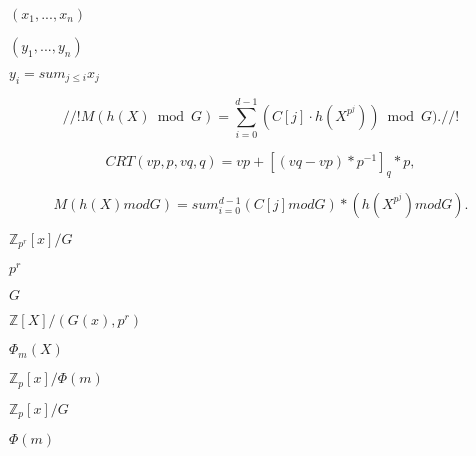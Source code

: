 \documentclass{article}
\begin{document}
$(x_1, ..., x_n)$
\pagebreak

$(y_1, ..., y_n)$
\pagebreak

$y_i = sum_{j\le i} x_j$
\pagebreak

\[ //! M(h(X) \bmod G)= \sum_{i=0}^{d-1}(C[j] \cdot h(X^{p^j}))\bmod G). //! \]
\pagebreak

\[ CRT(vp,p,vq,q) = vp + [(vq-vp) * p^{-1}]_q * p, \]
\pagebreak

\[ M(h(X) mod G) = sum_{i=0}^{d-1} (C[j] mod G) * (h(X^{p^j}) mod G).\]
\pagebreak

$\mathbb{Z}_{p^r}[x]/G$
\pagebreak

$p^r$
\pagebreak

$ G$
\pagebreak

$\mathbb{Z}[X]/(G(x),p^r)$
\pagebreak

$\Phi_m(X)$
\pagebreak

$\mathbb{Z}_p[x]/\Phi(m)$
\pagebreak

$\mathbb{Z}_p[x]/G$
\pagebreak

$\Phi(m)$
\pagebreak
\end{document}
